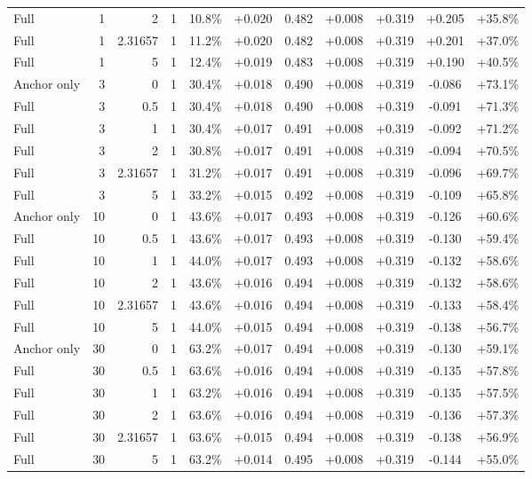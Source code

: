 \begin{table}[htbp]
\begin{tabular}{lrrrccccccc}
Full & 1 & 2 & 1 & 10.8\% & +0.020 & 0.482 & +0.008 & +0.319 & +0.205 & +35.8\% \\
Full & 1 & 2.31657 & 1 & 11.2\% & +0.020 & 0.482 & +0.008 & +0.319 & +0.201 & +37.0\% \\
Full & 1 & 5 & 1 & 12.4\% & +0.019 & 0.483 & +0.008 & +0.319 & +0.190 & +40.5\% \\
Anchor only & 3 & 0 & 1 & 30.4\% & +0.018 & 0.490 & +0.008 & +0.319 & -0.086 & +73.1\% \\
Full & 3 & 0.5 & 1 & 30.4\% & +0.018 & 0.490 & +0.008 & +0.319 & -0.091 & +71.3\% \\
Full & 3 & 1 & 1 & 30.4\% & +0.017 & 0.491 & +0.008 & +0.319 & -0.092 & +71.2\% \\
Full & 3 & 2 & 1 & 30.8\% & +0.017 & 0.491 & +0.008 & +0.319 & -0.094 & +70.5\% \\
Full & 3 & 2.31657 & 1 & 31.2\% & +0.017 & 0.491 & +0.008 & +0.319 & -0.096 & +69.7\% \\
Full & 3 & 5 & 1 & 33.2\% & +0.015 & 0.492 & +0.008 & +0.319 & -0.109 & +65.8\% \\
Anchor only & 10 & 0 & 1 & 43.6\% & +0.017 & 0.493 & +0.008 & +0.319 & -0.126 & +60.6\% \\
Full & 10 & 0.5 & 1 & 43.6\% & +0.017 & 0.493 & +0.008 & +0.319 & -0.130 & +59.4\% \\
Full & 10 & 1 & 1 & 44.0\% & +0.017 & 0.493 & +0.008 & +0.319 & -0.132 & +58.6\% \\
Full & 10 & 2 & 1 & 43.6\% & +0.016 & 0.494 & +0.008 & +0.319 & -0.132 & +58.6\% \\
Full & 10 & 2.31657 & 1 & 43.6\% & +0.016 & 0.494 & +0.008 & +0.319 & -0.133 & +58.4\% \\
Full & 10 & 5 & 1 & 44.0\% & +0.015 & 0.494 & +0.008 & +0.319 & -0.138 & +56.7\% \\
Anchor only & 30 & 0 & 1 & 63.2\% & +0.017 & 0.494 & +0.008 & +0.319 & -0.130 & +59.1\% \\
Full & 30 & 0.5 & 1 & 63.6\% & +0.016 & 0.494 & +0.008 & +0.319 & -0.135 & +57.8\% \\
Full & 30 & 1 & 1 & 63.2\% & +0.016 & 0.494 & +0.008 & +0.319 & -0.135 & +57.5\% \\
Full & 30 & 2 & 1 & 63.6\% & +0.016 & 0.494 & +0.008 & +0.319 & -0.136 & +57.3\% \\
Full & 30 & 2.31657 & 1 & 63.6\% & +0.015 & 0.494 & +0.008 & +0.319 & -0.138 & +56.9\% \\
Full & 30 & 5 & 1 & 63.2\% & +0.014 & 0.495 & +0.008 & +0.319 & -0.144 & +55.0\% \\

\end{tabular}
\end{table}
